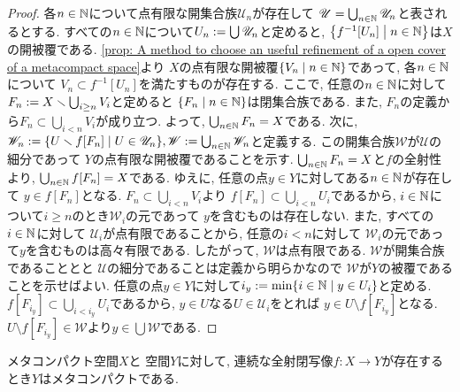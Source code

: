 \documentclass[uplatex, dvipdfmx, a4paper, 12pt, class=jsbook, crop=false]{standalone}
\begin{document}
\begin{proof}
	各$ n \in \mathbb{N} $について点有限な開集合族$ \mathscr{U}_n $が存在して
	$ \mathscr{U} = \bigcup_{n \in \mathbb{N}} \mathscr{U}_n $と表されるとする.
	すべての$ n \in \mathbb{N} $について$ U_n \mathrel{:=} \bigcup \mathscr{U}_n $と定めると,
	$ \setcomp{f^{-1}[U_n]}{n \in \N} $は$ X $の開被覆である.
	\cref{prop: A method to choose an useful refinement of a open cover of a metacompact space}より
	$ X $の点有限な開被覆$ \setcomp{V_n}{n \in \N} $であって, 各$ n \in \mathbb{N} $について
	$ V_n \subset f^{-1}[U_n] $を満たすものが存在する.
	ここで, 任意の$ n \in \mathbb{N} $に対して
	$ F_n \mathrel{:=} X \smallsetminus \bigcup_{i\geq n} V_i $と定めると
	$ \setcomp{F_n}{n \in \N} $は閉集合族である. 
	また, $ F_n $の定義から$ F_n \subset \bigcup_{i < n} V_i$が成り立つ.
	よって, $ \bigcup_{n \in \mathbb{N}} F_n = X $である.
	次に, $ \mathscr{W}_n \defeq \setcomp{U \setminus f[F_n]}{U \in \mathscr{U}_n}, 
	\mathscr{W} \defeq \bigcup_{n \in \N} \mathscr{W}_n $と定義する.
	この開集合族$ \mathscr{W} $が$ \mathscr{U} $の細分であって
	$ Y $の点有限な開被覆であることを示す.
	$ \bigcup_{n \in \mathbb{N}} F_n = X $と$ f $の全射性より, $ \bigcup_{n \in \mathbb{N}} f[F_n] = X $である.
	ゆえに, 任意の点$ y \in Y $に対してある$ n \in \mathbb{N} $が存在して
	$ y \in f[F_n] $となる. $ F_n \subset \bigcup_{i < n} V_i $より
	$ f[F_n] \subset \bigcup_{i < n} U_i $であるから, 
	$ i \in \mathbb{N} $について$ i \geq n $のとき$ \mathscr{W}_i $の元であって
	$ y $を含むものは存在しない. また, すべての$ i \in \mathbb{N} $に対して
	$ \mathscr{U}_i $が点有限であることから, 任意の$ i < n $に対して
	$ \mathscr{W}_i $の元であって$ y $を含むものは高々有限である.
	したがって, $ \mathscr{W} $は点有限である. 
	$ \mathscr{W} $が開集合族であることとと
	$ \mathscr{U} $の細分であることは定義から明らかなので
	$ \mathscr{W} $が$ Y $の被覆であることを示せばよい.
	任意の点$ y \in Y $に対して$ i_y \defeq \min \setcomp{i \in \N}{y \in U_i} $と定める.
	$ f[F_{i_y}] \subset \bigcup_{i < i_y} U_i $であるから,
	$ y \in U $なる$ U \in \mathscr{U}_i $をとれば
	$ y \in U \setminus f[F_{i_y}] $となる.
	$ U \setminus f[F_{i_y}] \in \mathscr{W} $より$ y \in \bigcup \mathscr{W} $である.	
\end{proof}

\begin{theorem}[Worrell]
	\label{thm:Worrell's Theorem}
	メタコンパクト空間$ X $と \Hausdorff 空間$ Y $に対して, 
	連続な全射閉写像$ f \colon X \to Y $が存在するとき$ Y $はメタコンパクトである.
\end{theorem}
\end{document}
